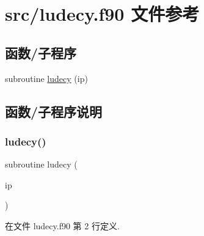 \hypertarget{ludecy_8f90}{}\section{src/ludecy.f90 文件参考}
\label{ludecy_8f90}
\subsection*{函数/子程序}
\begin{DoxyCompactItemize}
\item 
subroutine \mbox{\hyperlink{ludecy_8f90_a0e63ac3fb8e174c3bbe8daf1403e40ce}{ludecy}} (ip)
\end{DoxyCompactItemize}


\subsection{函数/子程序说明}
\mbox{\label{ludecy_8f90_a0e63ac3fb8e174c3bbe8daf1403e40ce}} 
\subsubsection{\texorpdfstring{ludecy()}{ludecy()}}
{\footnotesize\ttfamily subroutine ludecy (\begin{DoxyParamCaption}\item[{}]{ip }\end{DoxyParamCaption})}



在文件 ludecy.\+f90 第 2 行定义.

